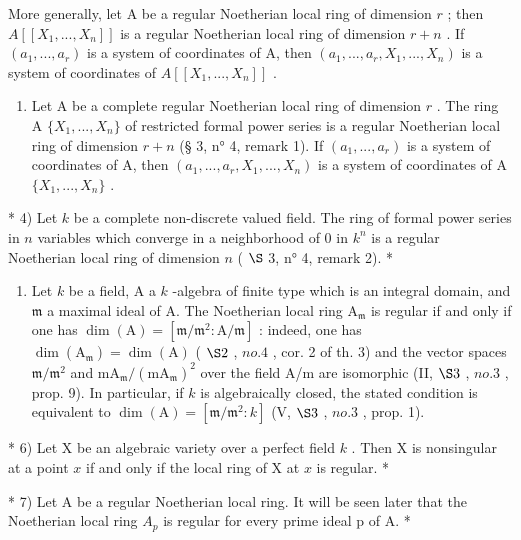 More generally, let A be a regular Noetherian local ring of dimension \(r\) ; then \(A[[X_1, ..., X_n]]\) is a regular Noetherian local ring of dimension \(r + n\) . If \((a_1, ..., a_r)\) is a system of coordinates of A, then \((a_1, ..., a_r, X_1, ..., X_n)\) is a system of coordinates of \(A[[X_1, ..., X_n]]\) .

\begin{enumerate}
\def\labelenumi{\arabic{enumi})}
\setcounter{enumi}{2}
\tightlist
\item
  Let A be a complete regular Noetherian local ring of dimension \(r\) . The ring A \(\{X_1, ..., X_n\}\) of restricted formal power series is a regular Noetherian local ring of dimension \(r + n\) (§ 3, n° 4, remark 1). If \((a_1, ..., a_r)\) is a system of coordinates of A, then \((a_1, ..., a_r, X_1, ..., X_n)\) is a system of coordinates of A \(\{X_1, ..., X_n\}\) .
\end{enumerate}

* 4) Let \(k\) be a complete non-discrete valued field. The ring of formal power series in \(n\) variables which converge in a neighborhood of 0 in \(k^n\) is a regular Noetherian local ring of dimension \(n\) ( \(\S\) 3, n° 4, remark 2). *

\begin{enumerate}
\def\labelenumi{\arabic{enumi})}
\setcounter{enumi}{4}
\tightlist
\item
  Let \(k\) be a field, A a \(k\) -algebra of finite type which is an integral domain, and \(\mathfrak{m}\) a maximal ideal of A. The Noetherian local ring \(\mathrm{A}_{\mathfrak{m}}\) is regular if and only if one has \(\dim(\mathrm{A}) = [\mathfrak{m}/\mathfrak{m}^{2}:\mathrm{A}/\mathfrak{m}]\) : indeed, one has \(\dim(\mathrm{A}_{\mathfrak{m}}) = \dim(\mathrm{A})\) ( \(\S 2\) , \(no. 4\) , cor. 2 of th. 3) and the vector spaces \(\mathfrak{m}/\mathfrak{m}^{2}\) and \(\mathrm{mA}_{\mathfrak{m}}/(\mathrm{mA}_{\mathfrak{m}})^{2}\) over the field A/m are isomorphic (II, \(\S 3\) , \(no. 3\) , prop. 9). In particular, if \(k\) is algebraically closed, the stated condition is equivalent to \(\dim(\mathrm{A}) = [\mathfrak{m}/\mathfrak{m}^{2}:k]\) (V, \(\S 3\) , \(no. 3\) , prop. 1).
\end{enumerate}

* 6) Let X be an algebraic variety over a perfect field \(k\) . Then X is nonsingular at a point \(x\) if and only if the local ring of X at \(x\) is regular. *

* 7) Let A be a regular Noetherian local ring. It will be seen later that the Noetherian local ring \(A_{p}\) is regular for every prime ideal p of A. *

